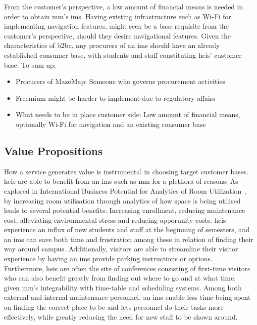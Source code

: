 From the customer's perspective, a low amount of financial means is needed in order to obtain \gls{mm}'s \gls{ims}. Having existing infrastructure such as Wi-Fi for implementing navigation features, might seen be a base requisite from the customer's perspective, should they desire navigational features. Given the characteristics of \gls{b2bc}, any procurers of an \gls{ims} should have an already established consumer base, with students and staff constituting \glspl{hei}' customer base. To sum up:


\begin{itemize}
    \item Procurers of MazeMap: Someone who governs procurement activities
    \item Freemium might be harder to implement due to regulatory affairs
    \item What needs to be in place customer side: Low amount of financial means, optionally Wi-Fi for navigation and an existing consumer base 
\end{itemize}

\subsection{Value Propositions}
How a service generates value is instrumental in choosing target customer bases. \glspl{hei} are able to benefit from an \gls{ims} such as \gls{mm} for a plethora of reasons: As explored in International Business Potential for Analytics of Room Utilization~\cite{karlbernhoffbinde2015}, by increasing room utilisation through analytics of how space is being utilised leads to several potential benefits: Increasing enrollment, reducing maintenance cost, alleviating environmental stress and reducing opporunity costs. \glspl{hei} experience an influx of new students and staff at the beginning of semesters, and an \gls{ims} can save both time and frustration among these in relation of finding their way around campus. Additionally, visitors are able to streamline their visitor experience by having an \gls{ims} provide parking instructions or options. Furthermore, \glspl{hei} are often the site of conferences consisting of first-time visitors who can also benefit greatly from finding out where to go and at what time, given \gls{mm}'s integrability with time-table and scheduling systems. Among both external and internal maintenance personnel, an \gls{ims} enable less time being spent on finding the correct place to be and lets personnel do their tasks more effectively, while greatly reducing the need for new staff to be shown around. 


